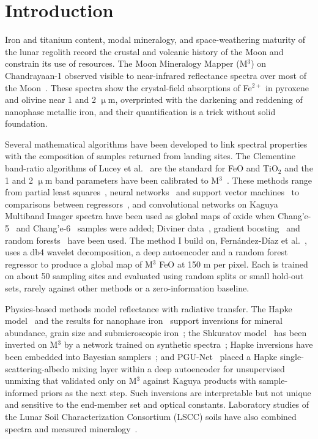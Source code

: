 \documentclass[remotesensing,article,submit,pdftex,moreauthors]{Definitions/mdpi}
\begin{document}
\section{Introduction}

Iron and titanium content, modal mineralogy, and space-weathering maturity of the lunar regolith record the crustal and volcanic history of the Moon and constrain its use of resources. The Moon Mineralogy Mapper (M$^{3}$) on Chandrayaan-1 observed visible to near-infrared reflectance spectra over most of the Moon~\cite{pieters2009,green2011}. These spectra show the crystal-field absorptions of Fe$^{2+}$ in pyroxene and olivine near 1 and 2 $\upmu$m, overprinted with the darkening and reddening of nanophase metallic iron, and their quantification is a trick without solid foundation.

Several mathematical algorithms have been developed to link spectral properties with the composition of samples returned from landing sites. The Clementine band-ratio algorithms of Lucey et al.~\cite{lucey2000} are the standard for FeO and TiO$_{2}$ and the 1 and 2 $\upmu$m band parameters have been calibrated to M$^{3}$~\cite{bhatt2012,bhatt2015}. These methods range from partial least squares~\cite{sun2016}, neural networks~\cite{xia2019} and support vector machines~\cite{wang2021} to comparisons between regressors~\cite{qiu2022}, and convolutional networks on Kaguya Multiband Imager spectra have been used as global maps of oxide when Chang'e-5~\cite{yang2023,zhang2023} and Chang'e-6~\cite{shi2026} samples were added; Diviner data~\cite{ma2022}, gradient boosting~\cite{wu2024} and random forests~\cite{fernandez2025} have been used. The method I build on, Fernández-Díaz et al.~\cite{fernandez2026}, uses a db4 wavelet decomposition, a deep autoencoder and a random forest regressor to produce a global map of M$^{3}$ FeO at 150 m per pixel. Each is trained on about 50 sampling sites and evaluated using random splits or small hold-out sets, rarely against other methods or a zero-information baseline.

Physics-based methods model reflectance with radiative transfer. The Hapke model~\cite{hapke1993} and the results for nanophase iron~\cite{hapke2001,lucey2011,pieters2016} support inversions for mineral abundance, grain size and submicroscopic iron~\cite{lili2011,sunlucey2021,trang2019}; the Shkuratov model~\cite{shkuratov1999} has been inverted on M$^{3}$ by a network trained on synthetic spectra~\cite{korokhin2024}; Hapke inversions have been embedded into Bayesian samplers~\cite{jung2026}; and PGU-Net~\cite{lin2026} placed a Hapke single-scattering-albedo mixing layer within a deep autoencoder for unsupervised unmixing that validated only on M$^{3}$ against Kaguya products with sample-informed priors as the next step. Such inversions are interpretable but not unique and sensitive to the end-member set and optical constants. Laboratory studies of the Lunar Soil Characterization Consortium (LSCC) soils have also combined spectra and measured mineralogy~\cite{li2012,grumpe2018,surkov2025}.
\end{document}
